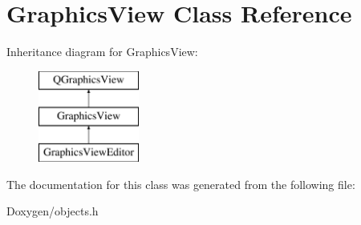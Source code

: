 \hypertarget{class_graphics_view}{\section{Graphics\-View Class Reference}
\label{class_graphics_view}
}
Inheritance diagram for Graphics\-View\-:\begin{figure}[H]
\begin{center}
\leavevmode
\includegraphics[height=3.000000cm]{class_graphics_view}
\end{center}
\end{figure}


The documentation for this class was generated from the following file\-:\begin{DoxyCompactItemize}
\item 
Doxygen/objects.\-h\end{DoxyCompactItemize}
